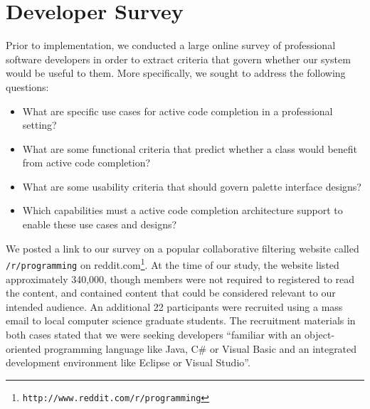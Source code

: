\documentclass[conference]{IEEEtran}
\begin{document}




%



\section{Developer Survey}

Prior to implementation, we conducted a large online survey of professional software developers in order to extract criteria that govern whether our system would be useful to them. More specifically, we sought to address the following questions:

\begin{itemize}
\item What are specific use cases for active code completion in a professional setting? 
\item What are some functional criteria that predict whether a class would benefit from active code completion?
\item What are some usability criteria that should govern palette interface designs?
\item Which capabilities must a active code completion architecture support to enable these use cases and designs?
\end{itemize}


We posted a link to our survey on a popular  collaborative filtering website \cite{mehta_robust_2007} called {\tt /r/programming} on reddit.com\footnote{\texttt{http://www.reddit.com/r/programming}}. At the time of our study, the website listed approximately 340,000, though members were not required to registered to read the content,  and contained content that could be considered relevant to our intended audience. An additional 22 participants were recruited using a mass email to local computer science graduate students. The recruitment materials in both cases stated that we were seeking developers ``familiar with an object-oriented programming language like Java, C\# or Visual Basic and an integrated development environment like Eclipse or Visual Studio''.
\end{document}

